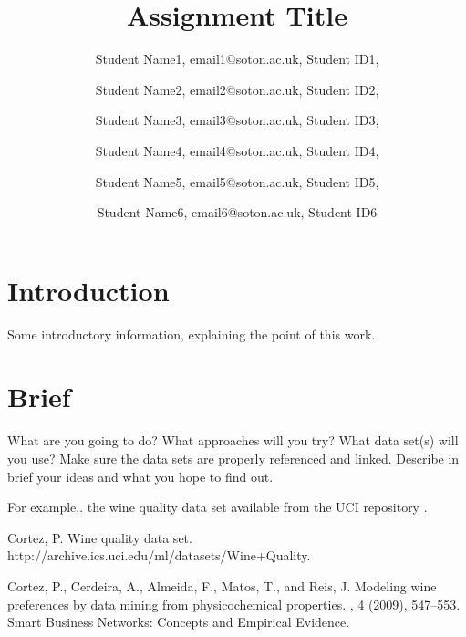 \documentclass[11pt]{article}
\title {Assignment Title}
\author{Student Name1, email1@soton.ac.uk, Student ID1,\and Student Name2, email2@soton.ac.uk, Student ID2, \and Student Name3, email3@soton.ac.uk, Student ID3, \and Student Name4, email4@soton.ac.uk, Student ID4, \and Student Name5, email5@soton.ac.uk, Student ID5, \and Student Name6, email6@soton.ac.uk, Student ID6}
\begin{document}
\maketitle
\section{Introduction}

Some introductory information, explaining the point of this work. 


\section{Brief}

What are you going to do? What approaches will you try? What data set(s) will you use? Make sure the data sets are properly referenced and linked. Describe in brief your ideas and what you hope to find out.


For example.. the wine quality data set \cite{Cortez2009} available from the UCI repository \cite{UCIrep}.



\begin{thebibliography}{1}

{\sc Cortez, P.}
\newblock Wine quality data set.
\newblock http://archive.ics.uci.edu/ml/datasets/Wine+Quality.

{\sc Cortez, P., Cerdeira, A., Almeida, F., Matos, T., and Reis, J.}
\newblock Modeling wine preferences by data mining from physicochemical
  properties.
, 4 (2009), 547--553.
\newblock Smart Business Networks: Concepts and Empirical Evidence.

\end{thebibliography}
  
\end{document}

